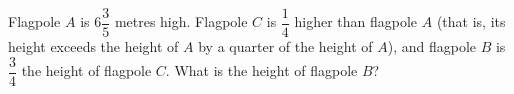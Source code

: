 Flagpole $A$ is $6\dfrac{3}{5}$ metres high. Flagpole $C$ is $\dfrac{1}{4}$ higher than flagpole $A$ (that is, its height exceeds the height of $A$ by a quarter of the height of $A$), and flagpole $B$ is $\dfrac{3}{4}$ the height of flagpole $C$. What is the height of flagpole $B$?

